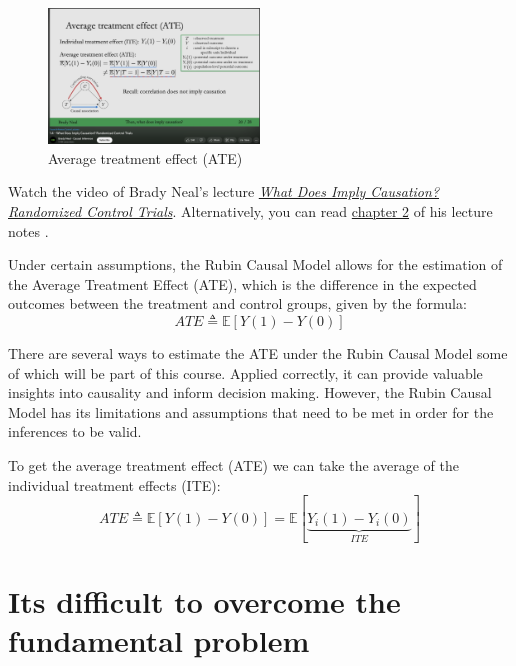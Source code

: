 \documentclass[
  12pt,
  oneside]{book}
\theoremstyle{definition}
\theoremstyle{definition}
\theoremstyle{definition}
\theoremstyle{definition}
\theoremstyle{remark}
\begin{document}
\begin{figure}
\centering
\includegraphics[width=0.5\textwidth,height=\textheight]{fig/neal-rct.png}
\caption[\label{fig:nealrct} Average treatment effect (ATE)]{\label{fig:nealrct} Average treatment effect (ATE)\footnotemark{}}
\end{figure}

Watch the video of Brady Neal's lecture \href{https://youtu.be/gGaWU8XEoGk}{\emph{What Does Imply Causation? Randomized Control Trials}}. Alternatively, you can read \href{https://www.bradyneal.com/Introduction_to_Causal_Inference-Dec17_2020-Neal.pdf}{chapter 2} of his lecture notes \citep{Neal2020Introduction}.

Under certain assumptions, the Rubin Causal Model allows for the estimation of the Average Treatment Effect (ATE), which is the difference in the expected outcomes between the treatment and control groups, given by the formula:
\[
ATE\triangleq \mathbb{E}[Y(1)-Y(0)]
\]

There are several ways to estimate the ATE under the Rubin Causal Model some of which will be part of this course. Applied correctly, it can provide valuable insights into causality and inform decision making. However, the Rubin Causal Model has its limitations and assumptions that need to be met in order for the inferences to be valid.

To get the average treatment effect (ATE) we can take the average of the individual treatment effects (ITE):
\begin{equation}
  ATE\triangleq \mathbb{E}[Y(1)-Y(0)] = \mathbb{E} [\underbrace{Y_i(1)-Y_i(0)}_{ITE}]
\label{eq:feq}
\end{equation}

\hypertarget{its-difficult-to-overcome-the-fundamental-problem}{%
\section{Its difficult to overcome the fundamental problem}\label{its-difficult-to-overcome-the-fundamental-problem}}
\end{document}
